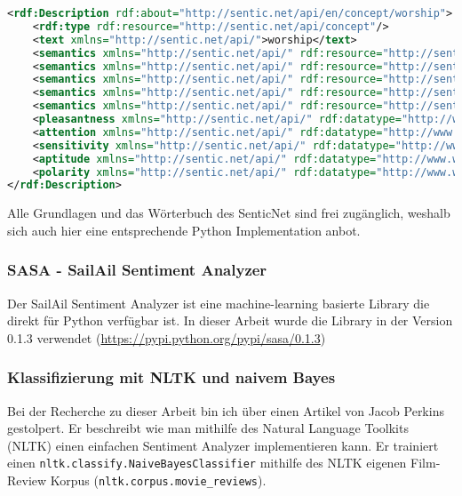 \begin{lstlisting}[language=XML, caption={SenticNet Wort}, label={lst:senticnetword}]
<rdf:Description rdf:about="http://sentic.net/api/en/concept/worship">
	<rdf:type rdf:resource="http://sentic.net/api/concept"/>
	<text xmlns="http://sentic.net/api/">worship</text>
	<semantics xmlns="http://sentic.net/api/" rdf:resource="http://sentic.net/api/en/concept/hope"/>
	<semantics xmlns="http://sentic.net/api/" rdf:resource="http://sentic.net/api/en/concept/religious_purpose"/>
	<semantics xmlns="http://sentic.net/api/" rdf:resource="http://sentic.net/api/en/concept/trust"/>
	<semantics xmlns="http://sentic.net/api/" rdf:resource="http://sentic.net/api/en/concept/devotion"/>
	<semantics xmlns="http://sentic.net/api/" rdf:resource="http://sentic.net/api/en/concept/religious"/>
	<pleasantness xmlns="http://sentic.net/api/" rdf:datatype="http://www.w3.org/2001/XMLSchema#float">+0.265</pleasantness>
	<attention xmlns="http://sentic.net/api/" rdf:datatype="http://www.w3.org/2001/XMLSchema#float">+0.601</attention>
	<sensitivity xmlns="http://sentic.net/api/" rdf:datatype="http://www.w3.org/2001/XMLSchema#float">-0.207</sensitivity>
	<aptitude xmlns="http://sentic.net/api/" rdf:datatype="http://www.w3.org/2001/XMLSchema#float">+0.373</aptitude>
	<polarity xmlns="http://sentic.net/api/" rdf:datatype="http://www.w3.org/2001/XMLSchema#float">+0.344</polarity>
</rdf:Description>
\end{lstlisting}

Alle Grundlagen und das Wörterbuch des SenticNet sind frei zugänglich, weshalb sich auch hier eine entsprechende Python Implementation anbot.

\subsubsection{SASA - SailAil Sentiment Analyzer}
Der SailAil Sentiment Analyzer ist eine machine-learning basierte Library die direkt für Python verfügbar ist. In dieser Arbeit wurde die Library in der Version 0.1.3 verwendet (\url{https://pypi.python.org/pypi/sasa/0.1.3})

\subsubsection{Klassifizierung mit NLTK und naivem Bayes}
\label{subsubsec:grundlagennaivebayes}
Bei der Recherche zu dieser Arbeit bin ich über einen Artikel von Jacob Perkins \cite{nltkbayes} gestolpert. Er beschreibt wie man mithilfe des Natural Language Toolkits (NLTK) \cite{nltk} einen einfachen Sentiment Analyzer implementieren kann. Er trainiert einen \lstinline$nltk.classify.NaiveBayesClassifier$ mithilfe des NLTK eigenen Film-Review Korpus (\lstinline$nltk.corpus.movie_reviews$).

